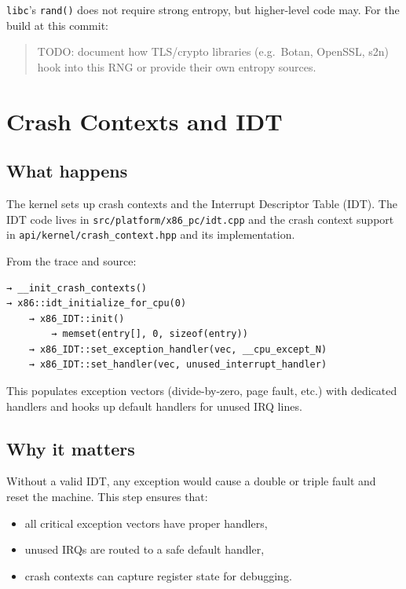 \documentclass[a4paper,11pt]{article}
\begin{document}
\texttt{libc}'s \texttt{rand()} does not require strong entropy, but
higher-level code may. For the build at this commit:

\begin{quote}
  TODO: document how TLS/crypto libraries (e.g.\ Botan, OpenSSL, s2n)
  hook into this RNG or provide their own entropy sources.
\end{quote}

\section{Crash Contexts and IDT}

\subsection{What happens}

The kernel sets up crash contexts and the Interrupt Descriptor Table
(IDT). The IDT code lives in \texttt{src/platform/x86\_pc/idt.cpp} and
the crash context support in \texttt{api/kernel/crash\_context.hpp} and
its implementation.

From the trace and source:

\begin{verbatim}
→ __init_crash_contexts()
→ x86::idt_initialize_for_cpu(0)
    → x86_IDT::init()
        → memset(entry[], 0, sizeof(entry))
    → x86_IDT::set_exception_handler(vec, __cpu_except_N)
    → x86_IDT::set_handler(vec, unused_interrupt_handler)
\end{verbatim}

This populates exception vectors (divide-by-zero, page fault, etc.) with
dedicated handlers and hooks up default handlers for unused IRQ lines.

\subsection{Why it matters}

Without a valid IDT, any exception would cause a double or triple fault
and reset the machine. This step ensures that:

\begin{itemize}
  \item all critical exception vectors have proper handlers,
  \item unused IRQs are routed to a safe default handler,
  \item crash contexts can capture register state for debugging.
\end{itemize}
\end{document}
